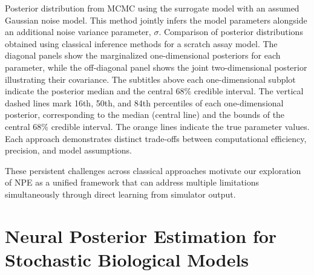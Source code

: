 \documentclass{article}
\providecommand{\DIFdeltex}[1]{{\protect\color{red} \scriptsize #1}} %
\providecommand{\DIFdelend}{} %
\providecommand{\DIFdelFL}[1]{\DIFdel{#1}} %
\providecommand{\DIFdel}[1]{\texorpdfstring{\DIFdeltex{#1}}{}} %
\DeclareRobustCommand{\DIFdelend}{\DIFOaddend \let\includegraphics\DIFOincludegraphics} %
\begin{document}

{%
\DIFdelFL{Posterior distribution from MCMC using the surrogate model with an assumed Gaussian noise model. This method jointly infers the model parameters alongside an additional noise variance parameter, $\sigma$.}}
{%
\DIFdelFL{Comparison of posterior distributions obtained using classical inference methods for a scratch assay model. The diagonal panels show the marginalized one-dimensional posteriors for each parameter, while the off-diagonal panel shows the joint two-dimensional posterior illustrating their covariance. The subtitles above each one-dimensional subplot indicate the  posterior median and the central 68\% credible interval. The vertical dashed lines mark 16th, 50th, and 84th percentiles of each one-dimensional posterior, corresponding to the median (central line) and the bounds of the central 68\% credible interval. The orange lines indicate the true parameter values. Each approach demonstrates distinct trade-offs between computational efficiency, precision, and model assumptions.}}

\DIFdel{These persistent challenges across classical approaches motivate our exploration of NPE as a unified framework that can address multiple limitations simultaneously through direct learning from simulator output.
}%

\section{\DIFdel{Neural Posterior Estimation for Stochastic Biological Models}}%
\addtocounter{section}{-1}%
\DIFdelend \label{sec:NPE}
\end{document}
